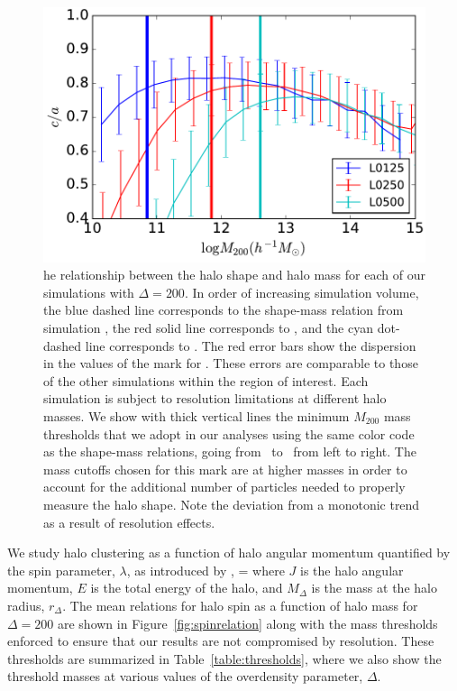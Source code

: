 \documentclass[usenatbib]{mnras}
\begin{document}
\begin{figure}
\centering
\includegraphics[width=.5\textwidth]{masscut_shape_d200.pdf}
\caption{
he relationship between the halo shape and halo mass for each of our simulations with $\Delta =200$. 
In order of increasing simulation volume, the blue dashed line corresponds to the shape-mass relation from simulation 
\simA, the red solid line corresponds to \simB, and the cyan dot-dashed line corresponds to \simC. The red error bars show the
dispersion in the values of the mark for \simB. These errors are comparable to those of the other simulations
within the region of interest.
Each simulation is subject to resolution limitations at different halo masses. We show with thick vertical lines 
the minimum $M_{200}$ mass thresholds that we adopt in our analyses using the same color code as 
the shape-mass relations, going from \simA \ to \simC \ from left to right. The mass cutoffs chosen for this mark
are at higher masses in order to account for the additional number of particles needed to properly measure the
halo shape. Note the deviation from a monotonic trend as a result of resolution effects.
}
\label{fig:srelation}
\end{figure}

We study halo clustering as a function of halo angular momentum quantified 
by the spin parameter, $\lambda$, as introduced by \citep{peebles69},
\beq
\lambda = 
\eeq
where $J$ is the halo angular momentum, $E$ is the total energy of the 
halo, and $M_{\Delta}$ is the mass at the halo radius, $r_{\Delta}$. 
The mean relations for halo spin as a function of halo mass for $\Delta=200$ 
are shown in Figure~\ref{fig:spinrelation} along with the mass thresholds 
enforced to ensure that our results are not compromised by resolution. 
These thresholds are summarized in Table~\ref{table:thresholds}, where 
we also show the threshold masses at various values of the overdensity 
parameter, $\Delta$.
\end{document}
